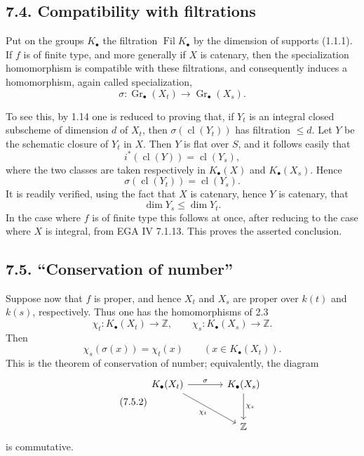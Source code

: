 \documentclass[11pt]{article}
\newcommand{\Gr}{\operatorname{Gr}}
\newcommand{\cl}{\operatorname{cl}}
\providecommand{\Gr}{\operatorname{Gr}}
\providecommand{\Gr}{\operatorname{G}}
\begin{document}
\subsection*{7.4. Compatibility with filtrations}
Put on the groups \(K_\bullet\) the filtration \(\operatorname{Fil}K_\bullet\) by the dimension of supports (1.1.1). If \(f\) is of finite type, and more generally if \(X\) is catenary, then the specialization homomorphism is compatible with these filtrations, and consequently induces a homomorphism, again called specialization,
\begin{equation}\tag{7.4.1}
  \sigma:\Gr_\bullet(X_t)\longrightarrow \Gr_\bullet(X_s).
\end{equation}

To see this, by 1.14 one is reduced to proving that, if \(Y_t\) is an integral closed subscheme of dimension \(d\) of \(X_t\), then \(\sigma(\cl(Y_t))\) has filtration \(\leq d\). Let \(Y\) be the schematic closure of \(Y_t\) in \(X\). Then \(Y\) is flat over \(S\), and it follows easily that
\[
  i^*(\cl(Y))=\cl(Y_s),
\]
where the two classes are taken respectively in \(K_\bullet(X)\) and \(K_\bullet(X_s)\). Hence
\[
  \sigma(\cl(Y_t))=\cl(Y_s).
\]
It is readily verified, using the fact that \(X\) is catenary, hence \(Y\) is catenary, that
\[
  \dim Y_s\leq \dim Y_t .
\]
In the case where \(f\) is of finite type this follows at once, after reducing to the case where \(X\) is integral, from EGA IV 7.1.13. This proves the asserted conclusion.

\subsection*{7.5. ``Conservation of number''}
Suppose now that \(f\) is proper, and hence \(X_t\) and \(X_s\) are proper over \(k(t)\) and \(k(s)\), respectively. Thus one has the homomorphisms of 2.3
\[
  \chi_t:K_\bullet(X_t)\longrightarrow \mathbb Z,\qquad
  \chi_s:K_\bullet(X_s)\longrightarrow \mathbb Z .
\]
Then
\begin{equation}\tag{7.5.1}
  \chi_s(\sigma(x))=\chi_t(x)\qquad (x\in K_\bullet(X_t)).
\end{equation}
This is the theorem of conservation of number; equivalently, the diagram
\begin{equation}\tag{7.5.2}
\begin{tikzcd}[column sep=large,row sep=large]
K_\bullet(X_t) \arrow[r,"\sigma"] \arrow[dr,"\chi_t"'] &
K_\bullet(X_s) \arrow[d,"\chi_s"]\\
& \mathbb Z
\end{tikzcd}
\end{equation}
is commutative.
\end{document}
